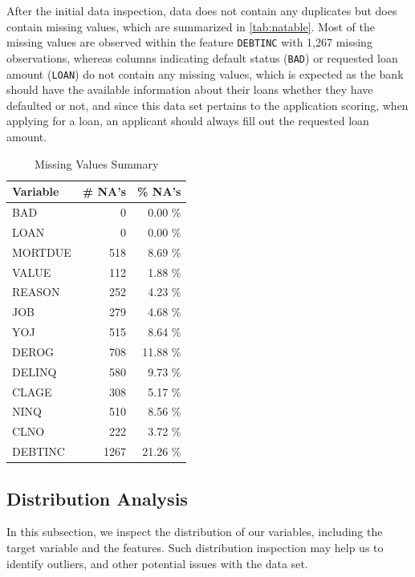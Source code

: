 After the initial data inspection, data does not contain any duplicates but does contain missing values, which are summarized in \autoref{tab:natable}.
Most of the missing values are observed within the feature \texttt{DEBTINC} with 1,267 missing observations,
whereas columns indicating default status (\texttt{BAD}) or requested loan amount (\texttt{LOAN}) do not contain any missing values, which is expected as the bank should have the available information about their loans whether they have defaulted or not, and since this data set pertains to the application scoring, when applying for a loan, an applicant should always fill out the requested loan amount.

\begin{table}[H]
\small
\setlength{\tabcolsep}{8pt}
\renewcommand{\arraystretch}{1.3}
\centering
\caption[Missing Values Summary]{Missing Values Summary}\label{tab:natable}
\begin{tabular}{l r r}
\toprule
\textbf{Variable} & \textbf{\# NA's} & \textbf{\% NA's}\\
\midrule
\hline
BAD & 0 & 0.00 \% \\
LOAN & 0 & 0.00 \% \\
MORTDUE & 518 & 8.69 \% \\
VALUE & 112 & 1.88 \% \\
REASON & 252 & 4.23 \% \\
JOB & 279 & 4.68 \% \\
YOJ & 515 & 8.64 \% \\
DEROG & 708 & 11.88 \% \\
DELINQ & 580 & 9.73 \% \\
CLAGE & 308 & 5.17 \% \\
NINQ & 510 & 8.56 \% \\
CLNO & 222 & 3.72 \% \\
DEBTINC & 1267 & 21.26 \% \\
\hline
\bottomrule
\end{tabular}
\vspace{0.35em}

\vspace{-1em}
\end{table}


\subsection{Distribution Analysis}
\label{subsec:distribution}
In this subsection, we inspect the distribution of our variables, including the target variable and the features.
Such distribution inspection may help us to identify outliers, and other potential issues with the data set.

